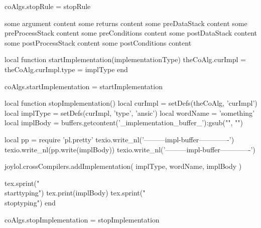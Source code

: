 coAlgs.stopRule = stopRule
\stopLuaCode

\startConTest
  \startRule[testRule]
    \arguments
      some argument content
    \returns
      some returns content
    \preDataStack
      some preDataStack content
    \preProcessStack
      some preProcessStack content
    \preConditions
      some preConditions content
    \postDataStack
      some postDataStack content
    \postProcessStack
      some postProcessStack content
    \postConditions  
      some postConditions content
  \stopRule
\stopConTest
\stopTestCase
\stopTestSuite


\startMkIVCode
\let\stopImplementation\relax

\def\stopImplementationDone{
  \directlua{thirddata.joyLoLCoAlgs.stopImplementation()}
}

\def\startImplementation[#1]{
  \directlua{thirddata.joyLoLCoAlgs.startImplementation('#1')}
  \buff_pickup{_implementation_buffer_}%
    {startImplementation}{stopImplementation}%
    {\relax}{\stopImplementationDone}\plusone%
}
\stopMkIVCode

\startLuaCode
local function startImplementation(implementationType)
  theCoAlg.curImpl      = { }
  theCoAlg.curImpl.type = implType
end

coAlgs.startImplementation = startImplementation

local function stopImplementation()
  local curImpl  = setDefs(theCoAlg, 'curImpl')
  local implType = setDefs(curImpl, 'type', 'ansic')
  local wordName = 'something'
  local implBody = buffers.getcontent('_implementation_buffer_'):gsub("", "\n")

  local pp = require 'pl.pretty'
  texio.write_nl('---------impl-buffer-------------')
  texio.write_nl(pp.write(implBody))
  texio.write_nl('---------impl-buffer-------------')

  joylol.crossCompilers.addImplementation(
    implType,
    wordName,
    implBody
  )

  tex.sprint("\\starttyping")
  tex.print(implBody)
  tex.sprint("\\stoptyping")
end

coAlgs.stopImplementation = stopImplementation
\stopLuaCode

\stopTestSuite


\startMkIVCode
\let\stopFragment\relax

